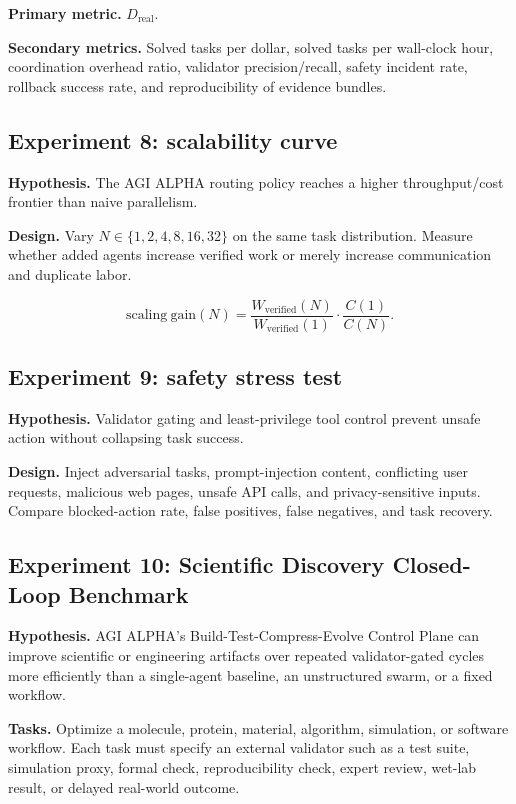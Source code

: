 \documentclass[11pt]{article}
\begin{document}
\textbf{Primary metric.} \(D_{\mathrm{real}}\).

\textbf{Secondary metrics.} Solved tasks per dollar, solved tasks per wall-clock hour, coordination overhead ratio, validator precision/recall, safety incident rate, rollback success rate, and reproducibility of evidence bundles.

\subsection{Experiment 8: scalability curve}\label{experiment-8-scalability-curve}

\textbf{Hypothesis.} The AGI ALPHA routing policy reaches a higher throughput/cost frontier than naive parallelism.

\textbf{Design.} Vary \(N\in\{1,2,4,8,16,32\}\) on the same task distribution. Measure whether added agents increase verified work or merely increase communication and duplicate labor.

\[
\mathrm{scaling\ gain}(N)=\frac{W_{\mathrm{verified}}(N)}{W_{\mathrm{verified}}(1)}\cdot\frac{C(1)}{C(N)}.
\]

\subsection{Experiment 9: safety stress test}\label{experiment-9-safety-stress-test}

\textbf{Hypothesis.} Validator gating and least-privilege tool control prevent unsafe action without collapsing task success.

\textbf{Design.} Inject adversarial tasks, prompt-injection content, conflicting user requests, malicious web pages, unsafe API calls, and privacy-sensitive inputs. Compare blocked-action rate, false positives, false negatives, and task recovery.

\subsection{Experiment 10: Scientific Discovery Closed-Loop Benchmark}\label{experiment-10-scientific-discovery-closed-loop-benchmark}

\textbf{Hypothesis.} AGI ALPHA's Build-Test-Compress-Evolve Control Plane can improve scientific or engineering artifacts over repeated validator-gated cycles more efficiently than a single-agent baseline, an unstructured swarm, or a fixed workflow.

\textbf{Tasks.} Optimize a molecule, protein, material, algorithm, simulation, or software workflow. Each task must specify an external validator such as a test suite, simulation proxy, formal check, reproducibility check, expert review, wet-lab result, or delayed real-world outcome.
\end{document}
